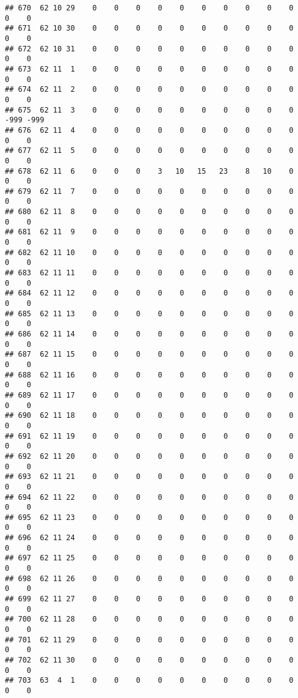 \documentclass[]{article}
\begin{document}
\begin{verbatim}
## 670  62 10 29    0    0    0    0    0    0    0    0    0    0    0    0
## 671  62 10 30    0    0    0    0    0    0    0    0    0    0    0    0
## 672  62 10 31    0    0    0    0    0    0    0    0    0    0    0    0
## 673  62 11  1    0    0    0    0    0    0    0    0    0    0    0    0
## 674  62 11  2    0    0    0    0    0    0    0    0    0    0    0    0
## 675  62 11  3    0    0    0    0    0    0    0    0    0    0 -999 -999
## 676  62 11  4    0    0    0    0    0    0    0    0    0    0    0    0
## 677  62 11  5    0    0    0    0    0    0    0    0    0    0    0    0
## 678  62 11  6    0    0    0    3   10   15   23    8   10    0    0    0
## 679  62 11  7    0    0    0    0    0    0    0    0    0    0    0    0
## 680  62 11  8    0    0    0    0    0    0    0    0    0    0    0    0
## 681  62 11  9    0    0    0    0    0    0    0    0    0    0    0    0
## 682  62 11 10    0    0    0    0    0    0    0    0    0    0    0    0
## 683  62 11 11    0    0    0    0    0    0    0    0    0    0    0    0
## 684  62 11 12    0    0    0    0    0    0    0    0    0    0    0    0
## 685  62 11 13    0    0    0    0    0    0    0    0    0    0    0    0
## 686  62 11 14    0    0    0    0    0    0    0    0    0    0    0    0
## 687  62 11 15    0    0    0    0    0    0    0    0    0    0    0    0
## 688  62 11 16    0    0    0    0    0    0    0    0    0    0    0    0
## 689  62 11 17    0    0    0    0    0    0    0    0    0    0    0    0
## 690  62 11 18    0    0    0    0    0    0    0    0    0    0    0    0
## 691  62 11 19    0    0    0    0    0    0    0    0    0    0    0    0
## 692  62 11 20    0    0    0    0    0    0    0    0    0    0    0    0
## 693  62 11 21    0    0    0    0    0    0    0    0    0    0    0    0
## 694  62 11 22    0    0    0    0    0    0    0    0    0    0    0    0
## 695  62 11 23    0    0    0    0    0    0    0    0    0    0    0    0
## 696  62 11 24    0    0    0    0    0    0    0    0    0    0    0    0
## 697  62 11 25    0    0    0    0    0    0    0    0    0    0    0    0
## 698  62 11 26    0    0    0    0    0    0    0    0    0    0    0    0
## 699  62 11 27    0    0    0    0    0    0    0    0    0    0    0    0
## 700  62 11 28    0    0    0    0    0    0    0    0    0    0    0    0
## 701  62 11 29    0    0    0    0    0    0    0    0    0    0    0    0
## 702  62 11 30    0    0    0    0    0    0    0    0    0    0    0    0
## 703  63  4  1    0    0    0    0    0    0    0    0    0    0    0    0

\end{verbatim}
\end{document}
